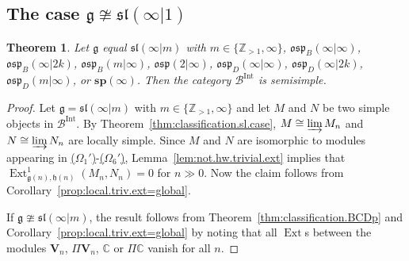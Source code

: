 \documentclass[12pt]{amsart}
\newcommand\C{\mathbb{C}}
\newcommand\Z{\mathbb{Z}}
\newcommand\g{\mathfrak{g}}
\newcommand\fh{\mathfrak{h}}
\newcommand\fsl{\mathfrak{sl}}
\newcommand\fosp{\mathfrak{osp}}
\newcommand\cB{\mathcal{B}}
\newcommand\bV{\mathbf{V}}
\newcommand\bsp{\mathbf{sp}}
\DeclareMathOperator{\Hom}{Hom}
\DeclareMathOperator{\Ext}{Ext}
\DeclareMathOperator{\Int}{Int}
\theoremstyle{plain}
\newtheorem{theo}{Theorem}[section]
\theoremstyle{definition}
\numberwithin{equation}{section}
\begin{document}
\subsection{The case $\g\ncong \fsl(\infty|1)$}
\begin{theo}\label{thm:B.C.D.sp.q-ss}
Let $\g$ equal $\fsl(\infty | m)$ with $m\in \{\Z_{>1}, \infty\}$, $\fosp_B(\infty|\infty)$, $\fosp_B(\infty|2k)$, $\fosp_B(m|\infty)$, $\fosp(2|\infty)$, $\fosp_D(\infty|\infty)$, $\fosp_D(\infty|2k)$, $\fosp_D(m|\infty)$, or $\bsp(\infty)$. Then the category $\cB^{\Int}$ is semisimple.
\end{theo}
\begin{proof}
Let $\g = \fsl(\infty | m)$ with $m\in \{\Z_{>1}, \infty\}$ and let $M$ and $N$ be two simple objects in $\cB^{\Int}$. By Theorem~\ref{thm:classification.sl.case}, $M \cong \varinjlim M_n$ and $N \cong \varinjlim N_n$ are locally simple. Since $M$ and $N$ are isomorphic to modules appearing in {\rm \hyperref[sym.type.mod]{($\Omega_1'$)}-\hyperref[partition.type.mod.dual]{($\Omega_6'$)}}, Lemma~\ref{lem:not.hw.trivial.ext} implies that $\Ext_{\g(n), \fh(n)}^1(M_n,N_n)=0$ for $n\gg 0$. Now the claim follows from Corollary~\ref{prop:local.triv.ext=global}.

If $\g\ncong \fsl(\infty|m)$, the result follows from Theorem~\ref{thm:classification.BCDp} and Corollary~\ref{prop:local.triv.ext=global} by noting that all $\Ext$s between the modules $\bV_n$, $\Pi \bV_n$, $\C$ or $\Pi\C$ vanish for all $n$.

\end{proof}
\end{document}
